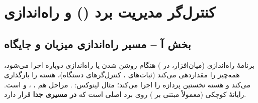 \section{کنترل‌گر مدیریت برد () و راه‌اندازی}

\subsection*{بخش آ – مسیر راه‌اندازی میزبان و جایگاه }

برنامهٔ راه‌اندازی (میان‌افزار، در ) هنگام روشن شدن یا راه‌اندازی دوباره اجرا می‌شود، همه‌چیز را مقداردهی می‌کند (ثبات‌های ، کنترل‌گرهای دستگاه)، هسته را بارگذاری می‌کند و هسته نخستین پردازه را اجرا می‌کند؛ مثال لینوکس: . مراحل  هم ، ،  و  است.  رایانهٔ کوچکی (معمولاً  مبتنی بر ) روی برد اصلی است که \textbf{در مسیری جدا} قرار دارد.

